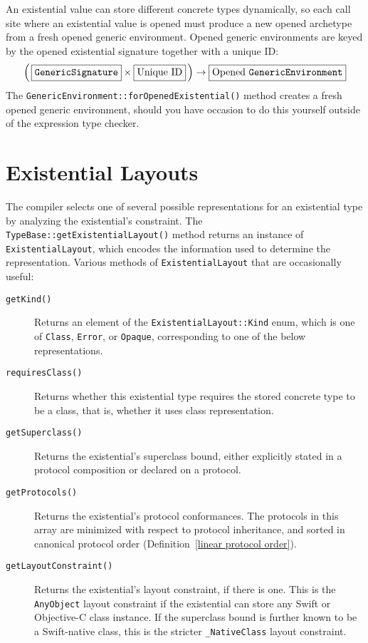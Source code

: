 \documentclass[a4paper,headsepline,bibliography=totoc,toc=flat,fleqn,twoside=semi]{scrbook}
\theoremstyle{definition}
\theoremstyle{definition}
\theoremstyle{definition}
\newcommand{\mathboxed}[1]{\boxed{\mbox{\vphantom{pI\texttt{pI}}#1}}}
\newcommand{\ttbox}[1]{\boxed{\mbox{\vphantom{pI\texttt{pI}}\texttt{#1}}}}
\begin{document}
An existential value can store different concrete types dynamically, so each call site where an existential value is opened must produce a new opened archetype from a fresh opened generic environment. Opened generic environments are keyed by the opened existential signature together with a unique ID:
\[\left(\,\ttbox{GenericSignature}\times \mathboxed{Unique ID}\,\right) \rightarrow \mathboxed{Opened \texttt{GenericEnvironment}}\]
The \texttt{GenericEnvironment::forOpenedExistential()} method creates a fresh opened generic environment, should you have occasion to do this yourself outside of the expression type checker.

\section{Existential Layouts}\label{existentiallayouts}

The compiler selects one of several possible representations for an existential type by analyzing the existential's constraint. The \texttt{TypeBase::getExistentialLayout()} method returns an instance of \texttt{ExistentialLayout}, which encodes the information used to determine the representation. Various methods of \texttt{ExistentialLayout} that are occasionally useful:
\begin{description}
\item[\texttt{getKind()}] Returns an element of the \texttt{ExistentialLayout::Kind} enum, which is one of \texttt{Class}, \texttt{Error}, or \texttt{Opaque}, corresponding to one of the below representations.
\item[\texttt{requiresClass()}] Returns whether this existential type requires the stored concrete type to be a class, that is, whether it uses class representation.
\item[\texttt{getSuperclass()}] Returns the existential's superclass bound, either explicitly stated in a protocol composition or declared on a protocol.
\item[\texttt{getProtocols()}] Returns the existential's protocol conformances. The protocols in this array are minimized with respect to protocol inheritance, and sorted in canonical protocol order (Definition~\ref{linear protocol order}).
\item[\texttt{getLayoutConstraint()}] Returns the existential's layout constraint, if there is one. This is the \texttt{AnyObject} layout constraint if the existential can store any Swift or Objective-C class instance. If the superclass bound is further known to be a Swift-native class, this is the stricter \texttt{\_NativeClass} layout constraint.
\end{description}
\end{document}
